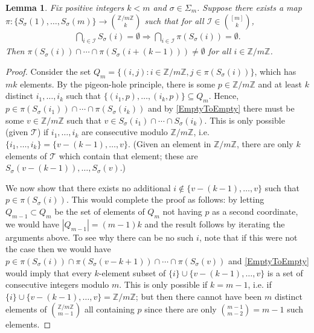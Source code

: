 \documentclass[journal, onecolumn]{IEEEtran}
\newtheorem{lemma}{Lemma}
\begin{document}

\begin{lemma}\label{NonEmptyLemma} Fix positive integers $k < m$ and $\sigma \in \Sigma_m$. Suppose there exists a map $\pi: \{S_\sigma(1), \ldots, S_\sigma(m)\} \to {\mathbb{Z}/m\mathbb{Z} \choose k}$ such that for all $\mathcal{I} \in {[m] \choose k}$,
\begin{align}\label{EmptyToEmpty}
 \bigcap_{i \in \mathcal{I}} S_\sigma(i) = \emptyset \Longrightarrow \bigcap_{i \in \mathcal{I}} \pi(S_\sigma(i)) = \emptyset.
\end{align}
%
Then  $\pi(S_\sigma(i)) \cap \cdots \cap \pi(S_\sigma(i+(k-1))) \neq \emptyset$ for all $i \in \mathbb{Z}/m\mathbb{Z}$.
\end{lemma}

\begin{proof} Consider the set $Q_m = \{ (i,j) : i \in \mathbb{Z}/m\mathbb{Z}, j \in \pi(S_\sigma(i)) \}$, which has $mk$ elements. By the pigeon-hole principle, there is some $p \in \mathbb{Z}/m\mathbb{Z}$ and at least $k$ distinct $i_1, \ldots, i_k$ such that $\{(i_1, p), \ldots, (i_k, p)\} \subseteq Q_m$. Hence, $p \in \pi(S_\sigma(i_1)) \cap \cdots \cap \pi(S_\sigma(i_k))$ and by \eqref{EmptyToEmpty} there must be some $v \in \mathbb{Z}/m\mathbb{Z}$ such that $v \in S_\sigma(i_1) \cap \cdots \cap S_\sigma(i_k)$. This is only possible (given $\mathcal{T}$) if $i_1, \ldots, i_k$ are consecutive modulo $\mathbb{Z}/m\mathbb{Z}$, i.e. $\{i_1, \ldots, i_k\} = \{v - (k-1), \ldots, v\}$. (Given an element in $\mathbb{Z}/m\mathbb{Z}$, there are only $k$ elements of $\mathcal{T}$ which contain that element; these are $S_\sigma(v-(k-1)), \ldots, S_\sigma(v)$.)

We now show that there exists no additional $i \notin \{v - (k-1), \ldots, v\}$ such that $p \in \pi(S_\sigma(i))$. This would complete the proof as follows: by letting $Q_{m-1} \subset Q_m$ be the set of elements of $Q_m$ not having $p$ as a second coordinate, we would have $|Q_{m-1}| = (m-1)k$ and the result follows by iterating the arguments above. To see why there can be no such $i$, note that if this were not the case then we would have $p \in \pi(S_\sigma(i)) \cap \pi(S_\sigma(v - k+1)) \cap \cdots \cap \pi(S_\sigma(v))$ and \eqref{EmptyToEmpty} would imply that every $k$-element subset of $\{i\} \cup \{v-(k-1), \ldots, v\}$ is a set of consecutive integers modulo $m$. This is only possible if $k = m-1$, i.e. if $\{i\} \cup \{v-(k-1), \ldots, v\} = \mathbb{Z}/m\mathbb{Z}$; but then there cannot have been $m$ distinct elements of ${\mathbb{Z}/m\mathbb{Z} \choose m-1}$ all containing $p$ since there are only ${m-1 \choose m-2}  = m-1$ such elements.
\end{proof}
\end{document}
